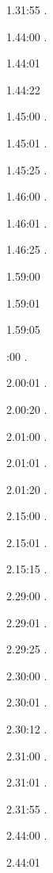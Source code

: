 \label{key}\documentclass[italian]{article}
\begin{document}
1.31:55   .

1.44:00   .

1.44:01   

1.44:22   

1.45:00   .

1.45:01   .

1.45:25   .

1.46:00   .

1.46:01   .

1.46:25   .

1.59:00   

1.59:01   

1.59:05   

:00  .

2.00:01   . 

2.00:20  .

2.01:00   . 

2.01:01  .

2.01:20   . 

2.15:00   . 

2.15:01   . 

2.15:15   . 

2.29:00   . 

2.29:01   . 

2.29:25   . 

2.30:00   .

2.30:01   .

2.30:12   .

2.31:00   .

2.31:01   .

2.31:55   .

2.44:00   .

2.44:01   
\end{document}
